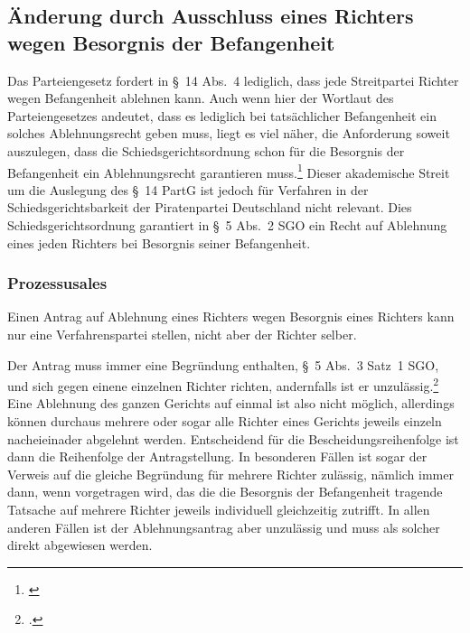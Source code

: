 \subsection{Änderung durch Ausschluss eines Richters wegen Besorgnis der Befangenheit}
\label{Zusammensetzung:Spruchkoerper:Befangenheitsbesorgnis}
Das Parteiengesetz fordert in \S~14 Abs.~4 lediglich, dass jede Streitpartei Richter wegen Befangenheit ablehnen kann.
Auch wenn hier der Wortlaut des Parteiengesetzes andeutet, dass es lediglich bei tatsächlicher Befangenheit ein solches Ablehnungsrecht geben muss, liegt es viel näher, die Anforderung soweit auszulegen, dass die Schiedsgerichtsordnung schon für die Besorgnis der Befangenheit ein Ablehnungsrecht garantieren muss.\footnote{\cites[Wißmann][\S~14 Rn~32]{kersten2007parteiengesetz}[Lenski][\S~14 Rn~23]{lenski2011parteiengesetz}}
Dieser akademische Streit um die Auslegung des \S~14 PartG ist jedoch für Verfahren in der Schiedsgerichtsbarkeit der Piratenpartei Deutschland nicht relevant.
Dies Schiedsgerichtsordnung garantiert in \S~5 Abs.~2 SGO ein Recht auf Ablehnung eines jeden Richters bei Besorgnis seiner Befangenheit.


\subsubsection{Prozessusales}
\label{Zusammensetzung:Spruchkoerper:Befangenheitsbesorgnis:Prozessuales}
Einen Antrag auf Ablehnung eines Richters wegen Besorgnis eines Richters kann nur eine Verfahrenspartei stellen, nicht aber der Richter selber.

Der Antrag muss immer eine Begründung enthalten, \S~5 Abs.~3 Satz~1 SGO, und sich gegen einene einzelnen Richter richten, andernfalls ist er unzulässig.\footnote{\cites[S.~1]{BSG201305062BefangenheitI}{BGHIIARZ101}.}
Eine Ablehnung des ganzen Gerichts auf einmal ist also nicht möglich, allerdings können durchaus mehrere oder sogar alle Richter eines Gerichts jeweils einzeln nacheieinader abgelehnt werden.
Entscheidend für die Bescheidungsreihenfolge ist dann die Reihenfolge der Antragstellung.
In besonderen Fällen ist sogar der Verweis auf die gleiche Begründung für mehrere Richter zulässig, nämlich immer dann, wenn vorgetragen wird, das die die Besorgnis der Befangenheit tragende Tatsache auf mehrere Richter jeweils individuell gleichzeitig zutrifft.
In allen anderen Fällen ist der Ablehnungsantrag aber unzulässig und muss als solcher direkt abgewiesen werden.

